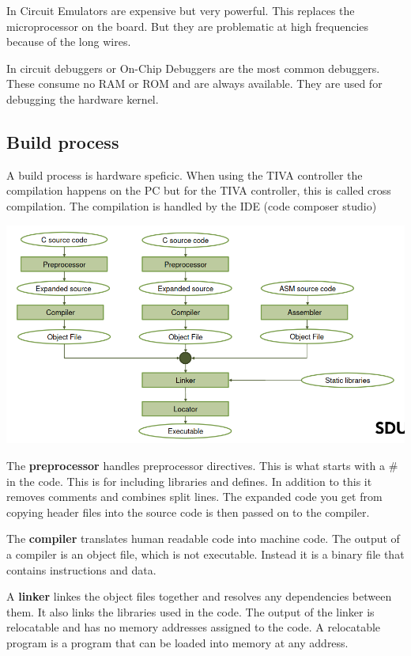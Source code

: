 In Circuit Emulators are expensive but very powerful. This replaces the
microprocessor on the board. But they are problematic at high frequencies
because of the long wires.

In circuit debuggers or On-Chip Debuggers are the most common debuggers.
These consume no RAM or ROM and are always available. They are used
for debugging the hardware kernel.



\subsection{Build process}

A build process is hardware speficic. When using the TIVA controller
the compilation happens on the PC but for the TIVA controller, this
is called cross compilation. The compilation is handled by the IDE
(code composer studio)

\begin{center}
	\includegraphics[width=\textwidth]{images/build.png}
\end{center}

The \textbf{preprocessor} handles preprocessor directives. This is what
starts with a \# in the code. This is for including libraries
and defines. In addition to this it removes comments and combines
split lines. The expanded code you get from copying header files
into the source code is then passed on to the compiler.

The \textbf{compiler} translates human readable code into machine code.
The output of a compiler is an object file, which is not executable.
Instead it is a binary file that contains instructions and data.

A \textbf{linker} linkes the object files together and resolves
any dependencies between them. It also links the libraries used
in the code. The output of the linker is relocatable and has no memory
addresses assigned to the code.
A relocatable program is a program that can be loaded into memory
at any address.


